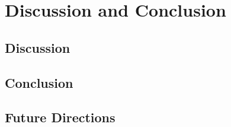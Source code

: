 \chapter{Discussion and Conclusion}
\section{Discussion}
\lipsum[1-12]

\section{Conclusion}
\lipsum[1-12]

\section{Future Directions}
\lipsum[1-6]